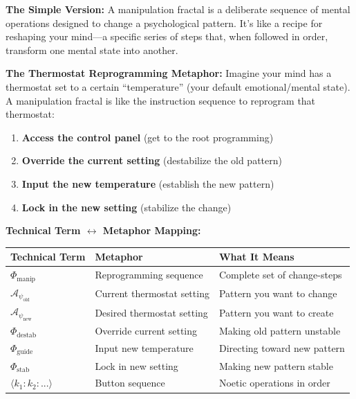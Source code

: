 \documentclass[11pt,twoside]{book}
\newcommand{\Frac}{\Phi}
\newcommand{\PsychAttractor}{\mathcal{A}_\psi}
\newcommand{\ManipFrac}{\Phi_{\mathrm{manip}}}
\begin{document}
\begin{tcolorbox}[colback=green!5!white,colframe=green!65!black,title=\textbf{Plain English: What is a Manipulation Fractal?},breakable]

\textbf{The Simple Version:}
A manipulation fractal is a deliberate sequence of mental operations designed to change a psychological pattern. It's like a recipe for reshaping your mind---a specific series of steps that, when followed in order, transform one mental state into another.

\textbf{The Thermostat Reprogramming Metaphor:}
Imagine your mind has a thermostat set to a certain ``temperature'' (your default emotional/mental state). A manipulation fractal is like the instruction sequence to reprogram that thermostat:

\begin{enumerate}
    \item \textbf{Access the control panel} (get to the root programming)
    \item \textbf{Override the current setting} (destabilize the old pattern)
    \item \textbf{Input the new temperature} (establish the new pattern)
    \item \textbf{Lock in the new setting} (stabilize the change)
\end{enumerate}

\textbf{Technical Term $\leftrightarrow$ Metaphor Mapping:}
\begin{center}
\footnotesize
\begin{tabularx}{\textwidth}{>{\raggedright\arraybackslash}X|>{\raggedright\arraybackslash}X|>{\raggedright\arraybackslash}X}
\toprule
\textbf{Technical Term} & \textbf{Metaphor} & \textbf{What It Means} \\
\midrule
$\ManipFrac$ & Reprogramming sequence & Complete set of change-steps \\
$\PsychAttractor_{\mathrm{old}}$ & Current thermostat setting & Pattern you want to change \\
$\PsychAttractor_{\mathrm{new}}$ & Desired thermostat setting & Pattern you want to create \\
$\Frac_{\mathrm{destab}}$ & Override current setting & Making old pattern unstable \\
$\Frac_{\mathrm{guide}}$ & Input new temperature & Directing toward new pattern \\
$\Frac_{\mathrm{stab}}$ & Lock in new setting & Making new pattern stable \\
$\langle k_1 : k_2 : ... \rangle$ & Button sequence & Noetic operations in order \\
\bottomrule
\end{tabularx}
\end{center}


\end{tcolorbox}
\end{document}
